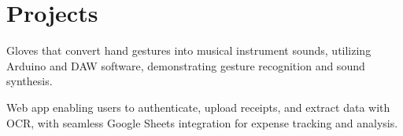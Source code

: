 \documentclass[]{resume-openfont}
\begin{document}
\begin{minipage}[t]{1\textwidth}
\vspace{-4 mm}
\section{Projects}
\titlerule
\vspace{2.5 mm}

Gloves that convert hand gestures into musical instrument sounds, utilizing Arduino and DAW software, demonstrating gesture recognition and sound synthesis.
\sectionsep

Web app enabling users to authenticate, upload receipts, and extract data with OCR, with seamless Google Sheets integration for expense tracking and analysis.
\sectionsep

\end{minipage} 
\end{document}
